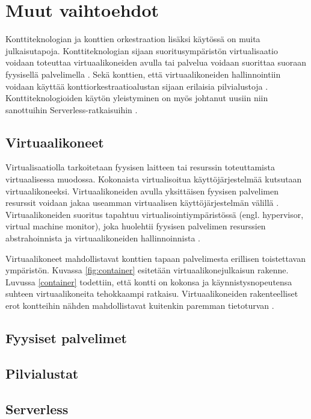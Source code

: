 \chapter{Muut vaihtoehdot\label{options}}

Konttiteknologian ja konttien orkestraation lisäksi käytössä on muita julkaisutapoja. Konttiteknologian sijaan suoritusympäristön virtualisaatio voidaan toteuttaa virtuaalikoneiden avulla tai palvelua voidaan suorittaa suoraan fyysisellä palvelimella \cite{Watada19}.
Sekä konttien, että virtuaalikoneiden hallinnointiin voidaan käyttää konttiorkestraatioalustan sijaan erilaisia pilvialustoja \cite{Bousselmi14}.
Konttiteknologioiden käytön yleistyminen on myös johtanut uusiin niin sanottuihin Serverless-ratkaisuihin \cite{Baldini17}.

\section{Virtuaalikoneet}

Virtualisaatiolla tarkoitetaan fyysisen laitteen tai resurssin toteuttamista virtuaalisessa muodossa.
Kokonaista virtualisoitua käyttöjärjestelmää kutsutaan virtuaalikoneeksi.
Virtuaalikoneiden avulla yksittäisen fyysisen palvelimen resurssit voidaan jakaa useamman virtuaalisen käyttöjärjestelmän välillä \cite{Smith05}.
Virtuaalikoneiden suoritus tapahtuu virtualisointiympäristössä (engl. hypervisor, virtual machine monitor), joka huolehtii fyysisen palvelimen resurssien abstrahoinnista ja virtuaalikoneiden hallinnoinnista \cite{desai13}.

Virtuaalikoneet mahdollistavat konttien tapaan palvelimesta erillisen toistettavan ympäristön.
Kuvassa \ref{fig:container} esitetään virtuaalikonejulkaisun rakenne.
Luvussa \ref{container} todettiin, että kontti on kokonsa ja käynnistysnopeutensa suhteen virtuaalikoneita tehokkaampi ratkaisu.
Virtuaalikoneiden rakenteelliset erot kontteihin nähden mahdollistavat kuitenkin paremman tietoturvan \cite{Sultan19}.


\section{Fyysiset palvelimet}


\section{Pilvialustat}


\section{Serverless}

